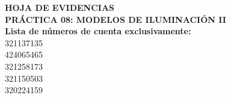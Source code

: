 \documentclass[letterpaper, 11pt]{article}
\newcommand{\numPractica}{08}
\newcommand{\tituloPractica}{Modelos de Iluminación II}
\newcommand{\cuentasEvidencias}{
    321137135 \\ 
    424065465 \\ 
    321258173 \\ 
    321150503 \\ 
    320224159 \\ 
}
\begin{document}


\newpage
{}
\setcounter{page}{2}

\begin{center}
    {\Large\bfseries HOJA DE EVIDENCIAS}\\[0.35cm]
    {\large\bfseries PRÁCTICA \numPractica: \MakeUppercase{\tituloPractica}}\\[0.35cm]
    \textbf{Lista de números de cuenta exclusivamente:}\\
    \cuentasEvidencias
\end{center}
\vspace{0.6cm}
\newpage









\end{document}
